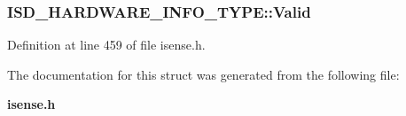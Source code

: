 \subsubsection[{\-Valid}]{ {\bf \-I\-S\-D\-\_\-\-H\-A\-R\-D\-W\-A\-R\-E\-\_\-\-I\-N\-F\-O\-\_\-\-T\-Y\-P\-E\-::\-Valid}}\label{structISD__HARDWARE__INFO__TYPE_ac6b038cb3a4cd5f625e3eb38ac8ff3a7}


\-Definition at line 459 of file isense.\-h.



\-The documentation for this struct was generated from the following file\-:\begin{DoxyCompactItemize}
\item 
{\bf isense.\-h}\end{DoxyCompactItemize}
